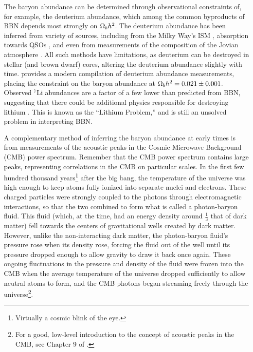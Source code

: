 

The baryon abundance can be determined through observational
constraints of, for example, the deuterium abundance, which among the
common byproducts of BBN depends most strongly on $\Omega_b h^2$. The
deuterium abundance has been inferred from variety of sources,
including from the Milky Way's ISM \citep{Linsky1993, Linsky1995},
absorption towards QSOs \citep{Tytler1996, Kirkman2003}, and even from
measurements of the composition of the Jovian atmosphere
\citep{Niemann1996}. All such methods have limitations, as deuterium
can be destroyed in stellar (and brown dwarf) cores, altering the
deuterium abundance slightly with time. \citet{Iocco2009} provides a
modern compilation of deuterium abundance measurements, placing the
constraint on the baryon abundance at $\Omega_b h^2 = 0.021 \pm
0.001$. Observed $^7$Li abundances are a factor of a few lower than
predicted from BBN, suggesting that there could be additional physics
responsible for destroying lithium \citep{Suzuki2000,
  Melendez2004}. This is known as the ``Lithium Problem,'' and is
still an unsolved problem in interpreting BBN.

A complementary method of inferring the baryon abundance at early
times is from measurements of the acoustic peaks in the Cosmic
Microwave Background (CMB) power spectrum. Remember that the CMB power
spectrum contains large peaks, representing correlations in the CMB on
particular scales. In the first few hundred thousand
years\footnote{Virtually a cosmic blink of the eye.} after the big
bang, the temperature of the universe was high enough to keep atoms
fully ionized into separate nuclei and electrons. These charged
particles were strongly coupled to the photons through electromagnetic
interactions, so that the two combined to form what is called a
photon-baryon fluid. This fluid (which, at the time, had an energy
density around $\frac{1}{3}$ that of dark matter) fell towards the
centers of gravitational wells created by dark matter. However, unlike
the non-interacting dark matter, the photon-baryon fluid's pressure
rose when its density rose, forcing the fluid out of the well
until its pressure dropped enough to allow gravity to draw it back
once again. These ongoing fluctuations in the pressure and density
of the fluid were frozen into the CMB when the average temperature of
the universe dropped sufficiently to allow neutral atoms to form, and
the CMB photons began streaming freely through the
universe\footnote{For a good, low-level introduction to the concept of
  acoustic peaks in the CMB, see Chapter 9 of \citet{Ryden2003}.}.

